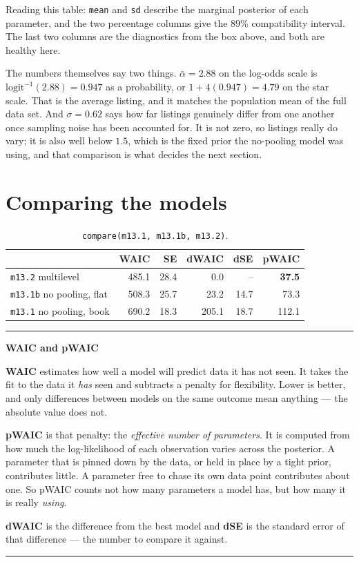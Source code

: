 \documentclass[11pt,a4paper]{article}
\newenvironment{infobox}[1]{%
  \par\vspace{6pt}\begin{center}\begin{minipage}{0.96\textwidth}%
  \rule{\linewidth}{0.8pt}\vspace{3pt}\par
  \textbf{#1}\par\vspace{4pt}\small
}{%
  \par\vspace{3pt}\rule{\linewidth}{0.8pt}%
  \end{minipage}\end{center}\vspace{6pt}\par
}
\begin{document}
Reading this table: \texttt{mean} and \texttt{sd} describe the marginal
posterior of each parameter, and the two percentage columns give the $89\%$
compatibility interval. The last two columns are the diagnostics from the box
above, and both are healthy here.

The numbers themselves say two things. $\bar\alpha = 2.88$ on the log-odds
scale is $\text{logit}^{-1}(2.88) = 0.947$ as a probability, or $1 + 4(0.947) =
4.79$ on the star scale. That is the average listing, and it matches the
population mean of the full data set. And $\sigma = 0.62$ says how far listings
genuinely differ from one another once sampling noise has been accounted for.
It is not zero, so listings really do vary; it is also well below $1.5$, which
is the fixed prior the no-pooling model was using, and that comparison is what
decides the next section.

\section{Comparing the models}

\begin{table}[h!]
\centering
\begin{tabular}{lrrrrr}
\toprule
 & WAIC & SE & dWAIC & dSE & \textbf{pWAIC} \\
\midrule
\texttt{m13.2}  multilevel        & 485.1 & 28.4 &   0.0 & --   & \textbf{37.5} \\
\texttt{m13.1b} no pooling, flat  & 508.3 & 25.7 &  23.2 & 14.7 & 73.3 \\
\texttt{m13.1}  no pooling, book  & 690.2 & 18.3 & 205.1 & 18.7 & 112.1 \\
\bottomrule
\end{tabular}
\caption{\texttt{compare(m13.1, m13.1b, m13.2)}.}
\end{table}

\begin{infobox}{WAIC and pWAIC}
\textbf{WAIC} estimates how well a model will predict data it has not seen. It
takes the fit to the data it \emph{has} seen and subtracts a penalty for
flexibility. Lower is better, and only differences between models on the same
outcome mean anything --- the absolute value does not.

\smallskip
\textbf{pWAIC} is that penalty: the \emph{effective number of parameters}. It is
computed from how much the log-likelihood of each observation varies across the
posterior. A parameter that is pinned down by the data, or held in place by a
tight prior, contributes little. A parameter free to chase its own data point
contributes about one. So pWAIC counts not how many parameters a model has, but
how many it is really \emph{using}.

\smallskip
\textbf{dWAIC} is the difference from the best model and \textbf{dSE} is the
standard error of that difference --- the number to compare it against.
\end{infobox}
\end{document}
